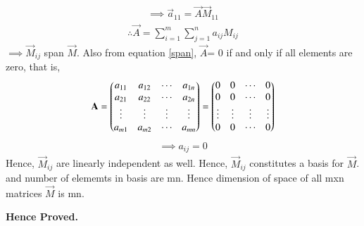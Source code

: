 \documentclass[journal,12pt,twocolumn]{IEEEtran}
\begin{document}
\begin{align}
\implies \vec{a}_{11} = \vec{A}\vec{M}_{11}
\end{align}
\begin{align}
\therefore\vec{A} = \sum_{i=1}^{m} \sum_{j=1}^{n} a_{ij}M_{ij} \label{span}
\end{align}
$\implies \vec{M}_{ij}$ span $\vec{M}$. 
Also from equation \eqref{span}, $\vec{A}$=  0 if and only if all elements are zero, that is, 
\begin{align}
\mathbf{A} = \begin{pmatrix}a_{11}&a_{12}&\cdots&a_{1n}\\a_{21}&a_{22}&\cdots&a_{2n}\\\vdots&\vdots&\vdots&\vdots\\a_{m1}&a_{m2}&\cdots&a_{mn}\end{pmatrix}= \begin{pmatrix}0&0&\cdots&0\\0&0&\cdots&0\\\vdots&\vdots&\vdots&\vdots\\0&0&\cdots&0\end{pmatrix}
\end{align}
\begin{align}
\implies a_{ij} = 0
\end{align}
Hence, $\vec{M}_{ij}$ are linearly independent as well. Hence, $\vec{M}_{ij}$ constitutes a basis for $\vec{M}$. and number of elememts in basis are mn. Hence dimension of space of all mxn matrices $\vec{M}$ is mn. 
\centerline{\textbf{Hence Proved.}}
\end{document}
